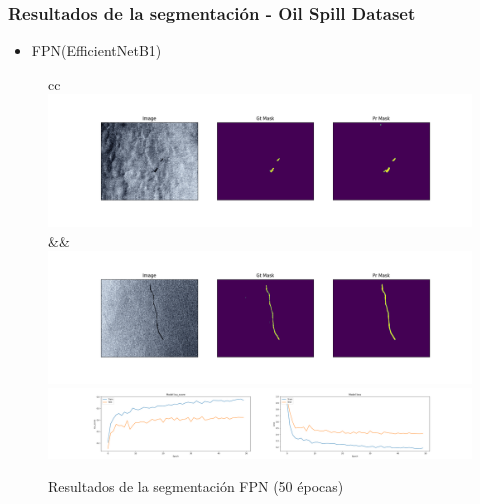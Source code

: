 \begin{frame}
\frametitle{Resultados de la segmentación - Oil Spill Dataset}
\begin{itemize}
    \item FPN(EfficientNetB1)
\end{itemize}
\begin{figure}
    \centering
    \begin{tabular}{cc}
         \includegraphics[scale=0.15]{img/section_06/fpn50/efficientnetb1_resultado73.png}&&
         \includegraphics[scale=0.15]{img/section_06/fpn50/efficientnetb1_resultado79.png}\\
         \includegraphics[scale=0.12]{img/section_06/fpn50/efficientnetb1_training_results.png}
    \end{tabular}
    \caption{Resultados de la segmentación FPN (50 épocas)}
    \label{fig:my_label}
\end{figure}
\end{frame}

